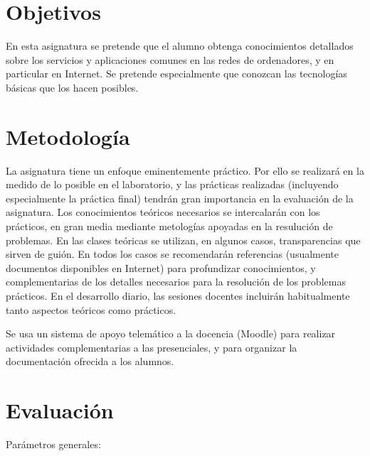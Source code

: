 \documentclass[a4paper,12pt]{report}
\begin{document}
\section{Objetivos}

En esta asignatura se pretende que el alumno obtenga conocimientos detallados sobre los servicios y aplicaciones comunes en las redes de ordenadores, y en particular en Internet. Se pretende especialmente que conozcan las tecnologías básicas que los hacen posibles.

\section{Metodología}

La asignatura tiene un enfoque eminentemente práctico. Por ello se realizará en la medido de lo posible en el laboratorio, y las prácticas realizadas (incluyendo especialmente la práctica final) tendrán gran importancia en la evaluación de la asignatura. Los conocimientos teóricos necesarios se intercalarán con los prácticos, en gran media mediante metologías apoyadas en la resulución de problemas. En las clases teóricas se utilizan, en algunos casos, transparencias que sirven de guión. En todos los casos se recomendarán referencias (usualmente documentos disponibles en Internet) para profundizar conocimientos, y complementarias de los detalles necesarios para la resolución de los problemas prácticos. En el desarrollo diario, las sesiones docentes incluirán habitualmente tanto aspectos teóricos como prácticos.

Se usa un sistema de apoyo telemático a la docencia (Moodle) para realizar actividades complementarias a las presenciales, y para organizar la documentación ofrecida a los alumnos.


\section{Evaluación}

Parámetros generales:
\end{document}
